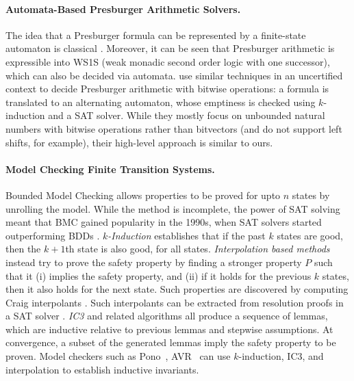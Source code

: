 \paragraph{Automata-Based Presburger Arithmetic Solvers.}
The idea that a Presburger formula can be represented by a finite-state automaton is classical \cite{buchi1990weak}.
Moreover, it can be seen that Presburger arithmetic is expressible into WS1S (weak monadic second order logic with one successor),
which can also be decided via automata.
%
\citet{automata-strike-back} use similar techniques in an uncertified context to
decide Presburger arithmetic with bitwise operations: a formula is translated
to an alternating automaton, whose emptiness is checked using $k$-induction and
a SAT solver.
%
While they mostly focus on unbounded natural numbers with bitwise operations
rather than bitvectors (and do not support left shifts, for example), their
high-level approach is similar to ours.

\paragraph{Model Checking Finite Transition Systems.}
Bounded Model Checking allows properties to be proved for upto $n$ states by unrolling the model.
While the method is incomplete, the power of SAT solving meant that BMC gained popularity in the 1990s,
when SAT solvers started outperforming BDDs \cite{biere1999symbolic}.
\emph{$k$-Induction} \cite{sheeran2000checking} establishes that if the past $k$ states are good, then the $k+1$th state is also good,
for all states.
\emph{Interpolation based methods} instead try to prove the safety property
by finding a stronger property $P$ such that it
(i) implies the safety property, and
(ii) if it holds for the previous $k$ states, then it also holds for the next state.
Such properties are discovered by computing Craig interpolants \cite{craig1957linear}.
Such interpolants can be extracted from resolution proofs in a SAT solver \cite{mcmillan2003interpolation}.
\emph{IC3} \cite{bradley2011sat} and related algorithms all produce a sequence of lemmas,
which are inductive relative to previous lemmas and stepwise assumptions.
At convergence, a subset of the generated lemmas imply the safety property to be proven.
Model checkers such as Pono~\cite{mann2021pono}, AVR~\cite{goel2020avr} can use $k$-induction,
IC3, and interpolation to establish inductive invariants.

